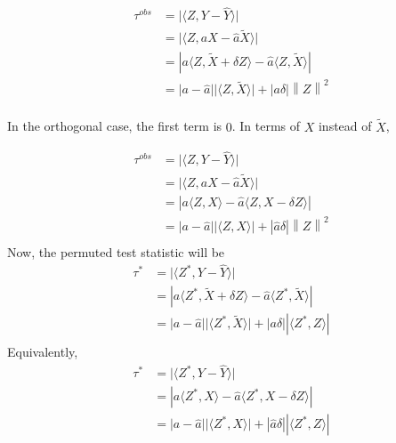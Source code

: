 \documentclass[12pt]{article}
\begin{document}
\begin{align*}
\tau^{obs} &= \lvert \langle Z, Y - \hat{Y} \rangle \rvert \\
&= \lvert \langle Z, aX  - \hat{a}\tilde{X} \rangle \rvert \\
&= \left\lvert a \langle Z, \tilde{X} + \delta Z \rangle - \hat{a} \langle Z, \tilde{X} \rangle \right\rvert \\
&= \lvert a-\hat{a}\rvert \lvert \langle Z, \tilde{X} \rangle\rvert  + \left\lvert a\delta\right\rvert \left\lVert Z \right\rVert^2 \\
\end{align*}

\noindent In the orthogonal case, the first term is $0$.
In terms of $X$ instead of $\tilde{X}$,

\begin{align*}
\tau^{obs} &= \lvert \langle Z, Y - \hat{Y} \rangle \rvert \\
&= \lvert \langle Z, aX  - \hat{a}\tilde{X} \rangle \rvert \\
&= \left\lvert a \langle Z, X\rangle - \hat{a} \langle Z, X - \delta Z \rangle \right\rvert \\
&= \lvert a-\hat{a}\rvert \lvert \langle Z, X \rangle\rvert  + \left\lvert \hat{a}\delta\right\rvert \left\lVert Z \right\rVert^2 \\
\end{align*}
Now, the permuted test statistic will be
\begin{align*}
\tau^* &= \lvert \langle Z^*, Y - \hat{Y} \rangle \rvert \\
&= \left\lvert a \langle Z^*, \tilde{X} +\delta Z \rangle - \hat{a} \langle Z^*, \tilde{X} \rangle \right\rvert \\
&= \lvert a-\hat{a}\rvert \lvert \langle Z^*, \tilde{X} \rangle\rvert  + \left\lvert a\delta\right\rvert \left\lvert \langle Z^*, Z \rangle \right\rvert \\
\end{align*}
\noindent Equivalently,
\begin{align*}
\tau^* &= \lvert \langle Z^*, Y - \hat{Y} \rangle \rvert \\
&= \left\lvert a \langle Z^*, X \rangle - \hat{a} \langle Z^*, X - \delta Z \rangle \right\rvert \\
&= \lvert a-\hat{a}\rvert \lvert \langle Z^*, X \rangle\rvert  + \left\lvert \hat{a}\delta\right\rvert \left\lvert \langle Z^*, Z \rangle \right\rvert \\
\end{align*}
\end{document}
